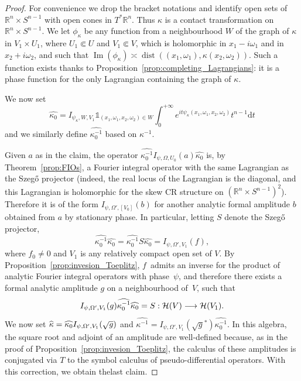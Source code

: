 \documentclass[10pt]{amsart}
\theoremstyle{definition}\newtheorem{defi}[theo]{Definition}\newtheorem{rema}[theo]{Remark}\newtheorem{exam}[theo]{Example}\newtheorem{exem}[theo]{Example}\newtheorem{nota}[theo]{Notation}
\DeclareMathOperator{\dist}{dist}
\DeclareMathOperator{\im}{Im}
\newcommand{\clH}{\mathcal{H}}
\newcommand\1{\mathds{1}}
\newcommand{\R}{\mathbb{R}}
\newcommand{\dd}{\mathrm{d}}
\let\oldhat\hat
\renewcommand*{\hat}[1]{\mathchoice{\widehat{#1}}{\widehat{#1}}{\oldhat{#1}}{\oldhat{#1}}}
\renewcommand*{\to}{\mathchoice{\longrightarrow}{\rightarrow}{\rightarrow}{\rightarrow}}
\begin{document}
\begin{proof}
For convenience we drop the bracket notations and identify open sets of $\R^n\times S^{n-1}$ with open cones in $T^*\R^n$. Thus $\kappa$ is a contact transformation on $\R^n\times S^{n-1}$. We let $\phi_{\kappa}$ be any function from a neighbourhood $W$ of the graph of $\kappa$ in $V_1\times U_1$, where $U_1\Subset U$ and $V_1\Subset V$, which is holomorphic in $x_1-i\omega_1$ and in $x_2+i\omega_2$, and such that $\im(\phi_{\kappa})\asymp
\dist((x_1,\omega_1),\kappa(x_2,\omega_2))$. Such a function exists thanks to Proposition~\ref{prop:completing_Lagrangians}: it is a phase function for the only Lagrangian containing the graph of $\kappa$.

We now set
\[
\widehat{\kappa_0}=I_{\psi_{\kappa},W,V_1}\1_{(x_1,\omega_1,x_2,\omega_2)\in W}\int_0^{+\infty}e^{it\psi_{\kappa}(x_1,\omega_1,x_2,\omega_2)}t^{n-1}\dd t
\]
and we similarly define $\widehat{\kappa_0^{-1}}$ based on $\kappa^{-1}$.

Given $a$ as in the claim, the operator $\widehat{\kappa_0^{-1}}I_{\psi,\Omega,U_0}(a)\widehat{\kappa_0}$ is, by Theorem~\ref{prop:FIOs}, a Fourier integral operator with the same Lagrangian as the Szeg\H{o} projector (indeed, the real locus of the Lagrangian is the diagonal, and this Lagrangian is holomorphic for the skew CR structure on $(\R^n\times S^{n-1})^2$). Therefore it is of the form $I_{\psi,\Omega',[V_0]}(b)$ for another analytic formal amplitude $b$ obtained from $a$ by stationary phase. In particular, letting $S$ denote the Szeg\H{o} projector,
\[
\widehat{\kappa_0^{-1}}\widehat{\kappa_0}=\widehat{\kappa_0^{-1}}S\widehat{\kappa_0}=I_{\psi,\Omega',V_1}(f),
\]
where $f_0\neq 0$ and $V_1$ is any relatively compact open set of $V$. By Proposition~\ref{prop:invesion_Toeplitz}, $f$~admits an inverse for the product of analytic Fourier {integral operators} with phase~$\psi$, and therefore there exists a formal analytic amplitude $g$ on a neighbourhood of~$V$, such that
\[
I_{\psi,\Omega',V_1}(g)\widehat{\kappa_0^{-1}}\widehat{\kappa_0}=S:\clH(V)\to
\clH(V_1).
\]
We now set $\hat{\kappa}=\widehat{\kappa_0}I_{\psi,
\Omega',V_1}(\sqrt{g})$ and $\widehat{\kappa^{-1}}=I_{\psi,\Omega',V_1}(\sqrt{g}^*)\widehat{\kappa_0^{-1}}$. In this algebra, the square root and adjoint of an amplitude are well-defined because, as in the proof of Proposition~\ref{prop:invesion_Toeplitz}, the calculus of these amplitudes is conjugated via $T$ to the symbol calculus of pseudo-differential operators. With this correction, we obtain the\linebreak last claim.


\end{proof}
\end{document}
